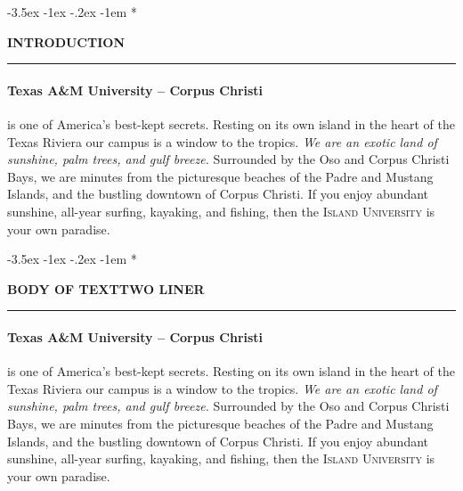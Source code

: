 \documentclass[pagesize,DIV14]{scrartcl}
\makeatletter
\renewcommand\section{\@startsection {section}{1}{\z@}%
                                   {-3.5ex \@plus -1ex \@minus -.2ex}%
                                   {-1em}%
                                   {\normalfont}}
\let\xsection=\section
\renewcommand{\section}[1]{\xsection*{\AvenirNext\fontsize{1em}{1.2em}\selectfont\bfseries\color{Blue} \uppercase{#1} \newline \color{Blue}\rule{2em}{1pt}}}
\makeatother
\begin{document}
\section{Introduction}
\begin{multicols}{2}

\paragraph*{Texas A\&M University -- Corpus Christi}\hspace{-1ex}is one of America's best-kept secrets. Resting on its own \mbox{island} in the heart of the Texas Riviera our campus is a window to the tropics. \textit{We are an exotic land of sunshine, palm trees, and gulf breeze.} Surrounded by the Oso and Corpus Christi Bays, we are minutes from the picturesque beaches of the Padre and Mustang Islands, and the bustling downtown of Corpus Christi. If you enjoy abundant sunshine, all-year surfing, kayaking, and fishing, then the \textsc{Island University} is your own paradise.

\section{Body of Text\newline Two Liner}

\paragraph*{Texas A\&M University -- Corpus Christi}\hspace{-1ex}is one of America's best-kept secrets. Resting on its own \mbox{island} in the heart of the Texas Riviera our campus is a window to the tropics. \textit{We are an exotic land of sunshine, palm trees, and gulf breeze.} Surrounded by the Oso and Corpus Christi Bays, we are minutes from the picturesque beaches of the Padre and Mustang Islands, and the bustling downtown of Corpus Christi. If you enjoy abundant sunshine, all-year surfing, kayaking, and fishing, then the \textsc{Island University} is your own paradise.

\end{multicols}

\clearpage
\end{document}
